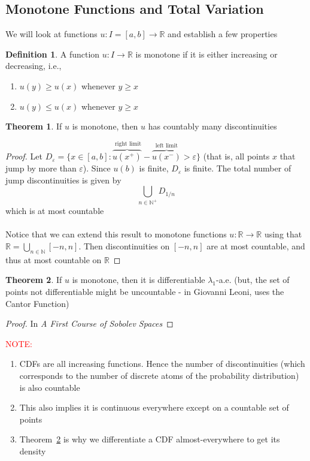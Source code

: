 \documentclass[11pt,a4paper]{article}
\theoremstyle{definition}
\newtheorem{definition}{Definition}[section]
\newtheorem{theorem}{Theorem}[section]
\begin{document}
\subsection{Monotone Functions and Total Variation}

We will look at functions $u: I = [a,b] \to \mathbb{R}$ and establish a few properties

\begin{definition}
A function $u: I \to \mathbb{R}$ is monotone if it is either increasing or decreasing, i.e.,

\begin{enumerate}
    \item $u(y) \ge u(x)$ whenever $y \ge x$
    \item $u(y) \le u(x)$ whenever $y \ge x$
\end{enumerate}
\end{definition}

\begin{theorem}
    If $u$ is monotone, then $u$ has countably many discontinuities
\end{theorem}
\begin{proof}
    Let $D_{\varepsilon} = \{x \in [a,b]:\overbrace{u(x^+)}^{\text{ right limit}}-\overbrace{u(x^-)}^{\text{left limit}}> \varepsilon\}$ (that is, all points $x$ that jump by more than $\varepsilon$). Since $u(b)$ is finite, $D_\varepsilon$ is finite. The total number of jump discontinuities is given by 
    \[
    \bigcup \limits _{n \in \mathbb{N}^+}D_{1/n}
    \]
    which is at most countable
    ~\\~\\
    Notice that we can extend this result to monotone functions $u : \mathbb{R} \to \mathbb{R}$ using that $\mathbb{R} = \bigcup \limits _{n \in \mathbb{N}} [-n,n]$. Then discontinuities on $[-n,n]$ are at most countable, and thus at most countable on $\mathbb{R}$
\end{proof}


\begin{theorem}\label{thm:monotone_diff}
    If $u$ is monotone, then it is differentiable $\lambda_1$-a.e. (but, the set of points not differentiable might be uncountable - in Giovanni Leoni, uses the Cantor Function)
\end{theorem}

\begin{proof}
    In \textit{A First Course of Sobolev Spaces}
\end{proof}

\noindent \textcolor{red}{NOTE:} 
\begin{enumerate}
    \item CDFs are all increasing functions. Hence the number of discontinuities (which corresponds to the number of discrete atoms of the probability distribution) is also countable
    \item This also implies it is continuous everywhere except on a countable set of points
    \item Theorem~\ref{thm:monotone_diff} is why we differentiate a CDF almost-everywhere to get its density
\end{enumerate}
\end{document}

